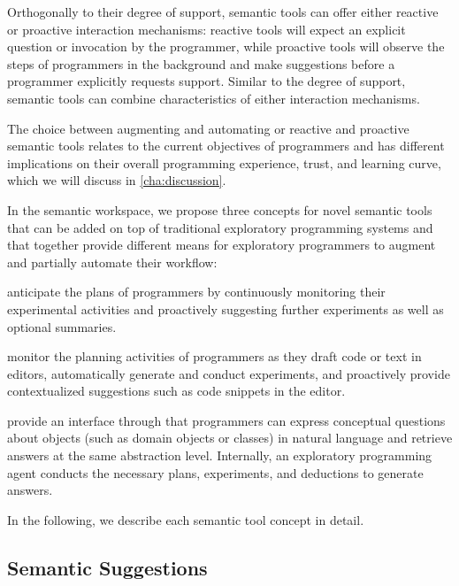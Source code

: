 Orthogonally to their degree of support, semantic tools can offer either reactive or proactive interaction mechanisms:
reactive tools will expect an explicit question or invocation by the programmer, while proactive tools will observe the steps of programmers in the background and make suggestions before a programmer explicitly requests support.
Similar to the degree of support, semantic tools can combine characteristics of either interaction mechanisms.

The choice between augmenting and automating or reactive and proactive semantic tools relates to the current objectives of programmers and has different implications on their overall programming experience, trust, and learning curve, which we will discuss in \cref{cha:discussion}.

In the semantic workspace, we propose three concepts for novel semantic tools that can be added on top of traditional exploratory programming systems and that together provide different means for exploratory programmers to augment and partially automate their workflow:

\begin{description}[noextralabelsep]
	\item[Semantic suggestions] anticipate the plans of programmers by continuously monitoring their experimental activities and proactively suggesting further experiments as well as optional summaries.
	\item[Semantic completions] monitor the planning activities of programmers as they draft code or text in editors, automatically generate and conduct experiments, and proactively provide contextualized suggestions such as code snippets in the editor.
	\item[Semantic conversations] provide an interface through that programmers can express conceptual questions about objects (such as domain objects or classes) in natural language and retrieve answers at the same abstraction level.
	Internally, an exploratory programming agent conducts the necessary plans, experiments, and deductions to generate answers.
\end{description}
In the following, we describe each semantic tool concept in detail.

\subsection{Semantic Suggestions}
\label{sec:approach/workspace/suggestions}

